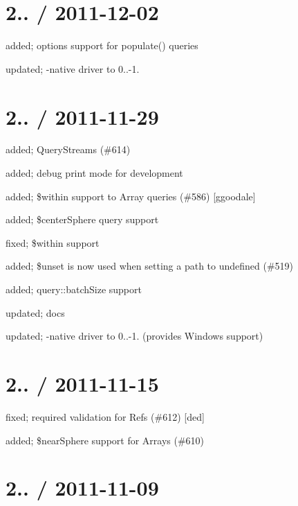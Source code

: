 \section*{2.. / 2011-\/12-\/02 }


\begin{DoxyItemize}
\item added; options support for populate() queries
\item updated; -\/native driver to 0..-\/1.
\end{DoxyItemize}

\section*{2.. / 2011-\/11-\/29 }


\begin{DoxyItemize}
\item added; Query\+Streams (\#614)
\item added; debug print mode for development
\item added; \$within support to Array queries (\#586) \mbox{[}ggoodale\mbox{]}
\item added; \$center\+Sphere query support
\item fixed; \$within support
\item added; \$unset is now used when setting a path to undefined (\#519)
\item added; query\+::batch\+Size support
\item updated; docs
\item updated; -\/native driver to 0..-\/1. (provides Windows support)
\end{DoxyItemize}

\section*{2.. / 2011-\/11-\/15 }


\begin{DoxyItemize}
\item fixed; required validation for Refs (\#612) \mbox{[}ded\mbox{]}
\item added; \$near\+Sphere support for Arrays (\#610)
\end{DoxyItemize}

\section*{2.. / 2011-\/11-\/09 }


